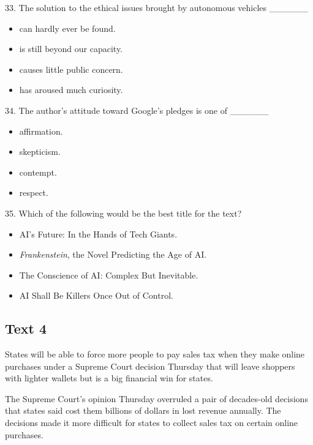 \documentclass[UTF8,11pt]{ctexart}
\begin{document}
33. The solution to the ethical issues brought by autonomous vehicles \_\_\_\_\_\_


\begin{itemize}[leftmargin=2em,itemsep=.2em,topsep=.4em]\item[A.] can hardly ever be found.
\item[B.] is still beyond our capacity.
\item[C.] causes little public concern.
\item[D.] has aroused much curiosity.
\end{itemize}

34. The author’s attitude toward Google’s pledges is one of \_\_\_\_\_\_


\begin{itemize}[leftmargin=2em,itemsep=.2em,topsep=.4em]\item[A.] affirmation.
\item[B.] skepticism.
\item[C.] contempt.
\item[D.] respect.
\end{itemize}

35. Which of the following would be the best title for the text?


\begin{itemize}[leftmargin=2em,itemsep=.2em,topsep=.4em]\item[A.] AI’s Future: In the Hands of Tech Giants.
\item[B.] \textit{Frankenstein}, the Novel Predicting the Age of AI.
\item[C.] The Conscience of AI: Complex But Inevitable.
\item[D.] AI Shall Be Killers Once Out of Control.
\end{itemize}

\subsection*{\textbf{Text 4}}


States will be able to force more people to pay sales tax when they make online purchases under a Supreme Court decision Thursday that will leave shoppers with lighter wallets but is a big financial win for states.


The Supreme Court’s opinion Thursday overruled a pair of decades-old decisions that states said cost them billions of dollars in lost revenue annually. The decisions made it more difficult for states to collect sales tax on certain online purchases.
\end{document}

